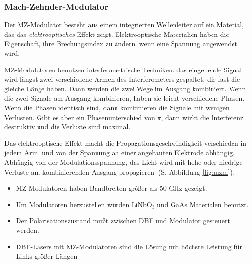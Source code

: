 \documentclass[a4paper]{article}
\begin{document}
\subsubsection{Mach-Zehnder-Modulator}
Der MZ-Modulator besteht aus einem integrierten Wellenleiter auf ein Material,
das das \emph{elektrooptisches} Effekt zeigt. Elektrooptische Materialien haben die
Eigenschaft, ihre Brechungsindex zu ändern, wenn eine Spannung angewendet wird.

MZ-Modulatoren benutzen interferometrische Techniken: das eingehende Signal
wird längst zwei verschiedene Armen des Interferometers gespaltet, die fast die
gleiche Länge haben. Dann werden die zwei Wege im Ausgang kombiniert. Wenn die
zwei Signale am Ausgang kombinieren, haben sie leicht verschiedene Phasen. Wenn
die Phasen identisch sind, dann kombinieren die Signale mit wenigen Verlusten.
Gibt es aber ein Phasenunterschied von $\pi$, dann wirkt die Interferenz
destruktiv und die Verluste sind maximal.

Das elektrooptische Effekt macht die Propagationsgeschwindigkeit verschieden in
jedem Arm, und von der Spannung an einer angebauten Elektrode abhängig.
Abhängig von der Modulationsspannung, das Licht wird mit hohe oder niedrige
Verluste am kombinierenden Ausgang propagieren. (S. Abbildung \ref{fig:mzm}). 

\begin{itemize}
  \item MZ-Modulatoren haben Bandbreiten größer als 50 GHz gezeigt. 
    
  \item Um Modulatoren herzustellen würden LiNbO$_3$ und GaAs Materialen
    benutzt. 

  \item Der Polarisationszustand mußt zwischen DBF und Modulator gesteuert
    werden.

  \item DBF-Lasers mit MZ-Modulatoren sind die Lösung mit höchste Leistung für
    Links größer Längen.
\end{itemize}
\end{document}
